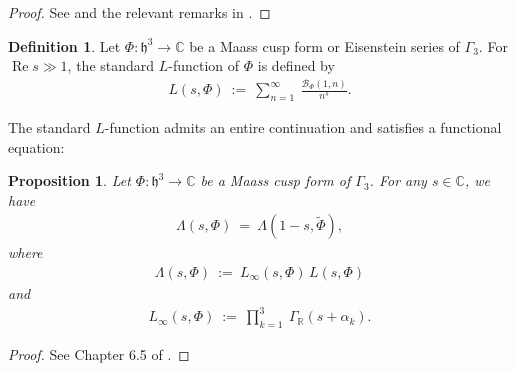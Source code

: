 \documentclass[11pt,reqno]{amsart}
\newtheorem{prop}[thm]{Proposition}
\theoremstyle{definition}
\theoremstyle{definition}
\newtheorem{defi}[thm]{Definition}
\theoremstyle{remark}
\newcommand{\R}{\ensuremath{\mathbb{R}}}
\newcommand{\C}{\ensuremath{\mathbb{C}}}
\numberwithin{equation}{section}
\DeclareMathOperator{\re}{Re}
\begin{document}
	
	\begin{proof}
 See \cite{Go15} and the relevant remarks in  \cite{Kw23}. 
	\end{proof}



	
	
	\begin{defi}\label{JPSSstdL}
		Let $\Phi: \mathfrak{h}^{3}\rightarrow \C$ be a Maass cusp form or Eisenstein series of $\Gamma_{3}$. For $\re s  \gg  1$,  the standard $L$-function of $\Phi$ is defined by
		\begin{align}\label{gl3stdL}
			L\left(s, \Phi \right)\ := \ \sum_{n=1}^{\infty} \ \frac{\mathcal{B}_{\Phi}(1,n)}{n^{s}}.   
		\end{align}
	\end{defi}
	
	
	
The standard $L$-function  admits an entire continuation and  satisfies a  functional equation: 
	
\begin{prop}\label{globgl3func}
	Let $\Phi: \mathfrak{h}^{3}\rightarrow \C$ be a Maass cusp form of $\Gamma_{3}$. For any $s\in \C$, we have
		\begin{align}\label{JPfunc}
		\Lambda\left(s, \Phi\right) \ = \ \Lambda(1-s,  \widetilde{\Phi}),
	\end{align}
	where 
	\begin{align}
	\Lambda\left(s, \Phi\right) \ := \ 	L_{\infty}\left(s, \Phi \right) \, L\left(s, \Phi\right)
	\end{align}
and
	\begin{align}
L_{\infty}\left(s, \Phi \right) \ := \  \prod_{k=1}^{3}  \ \Gamma_{\R}\left(s+\alpha_{k} \right). 
\end{align}



\end{prop}

	\begin{proof}
		See Chapter 6.5 of \cite{Go15}.
	\end{proof}
\end{document}
